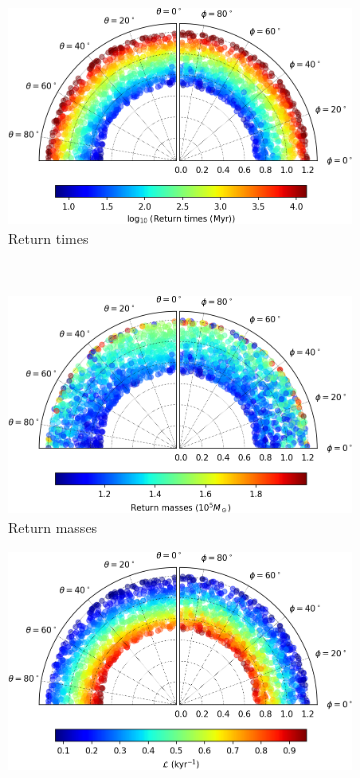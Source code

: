 \begin{figure}[h]
    \centering
    \begin{subfigure}[t]{0.4\textwidth}
        \includegraphics[width = \textwidth]{"../Files/Week 13/images/10_time"}
        \caption{Return times}
    \end{subfigure}
    ~ 
    \begin{subfigure}[t]{0.4\textwidth}
        \includegraphics[width=\textwidth]{"../Files/Week 13/images/10_mass"}
        \caption{Return masses}
    \end{subfigure}
    \begin{subfigure}[t]{0.4\textwidth}
        \includegraphics[width=\textwidth]{"../Files/Week 13/images/10_lyapunov"}

\end{subfigure}
\end{figure}
